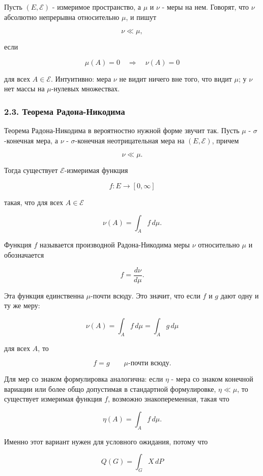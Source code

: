 \documentclass[
  11pt,
  a4paper,
]{article}
\begin{document}
Пусть \((E,\mathcal E)\) - измеримое пространство, а \(\mu\) и \(\nu\) -
меры на нем. Говорят, что \(\nu\) абсолютно непрерывна относительно
\(\mu\), и пишут

\[
\nu\ll\mu,
\]

если

\[
\mu(A)=0\quad\Longrightarrow\quad \nu(A)=0
\]

для всех \(A\in\mathcal E\). Интуитивно: мера \(\nu\) не видит ничего
вне того, что видит \(\mu\); у \(\nu\) нет массы на \(\mu\)-нулевых
множествах.

\subsubsection{2.3. Теорема
Радона-Никодима}\label{ux442ux435ux43eux440ux435ux43cux430-ux440ux430ux434ux43eux43dux430-ux43dux438ux43aux43eux434ux438ux43cux430}

Теорема Радона-Никодима в вероятностно нужной форме звучит так. Пусть
\(\mu\) - \(\sigma\)-конечная мера, а \(\nu\) - \(\sigma\)-конечная
неотрицательная мера на \((E,\mathcal E)\), причем

\[
\nu\ll\mu.
\]

Тогда существует \(\mathcal E\)-измеримая функция

\[
f:E\to[0,\infty]
\]

такая, что для всех \(A\in\mathcal E\)

\[
\nu(A)=\int_A f\,d\mu.
\]

Функция \(f\) называется производной Радона-Никодима меры \(\nu\)
относительно \(\mu\) и обозначается

\[
f=\frac{d\nu}{d\mu}.
\]

Эта функция единственна \(\mu\)-почти всюду. Это значит, что если \(f\)
и \(g\) дают одну и ту же меру:

\[
\nu(A)=\int_A f\,d\mu=\int_A g\,d\mu
\]

для всех \(A\), то

\[
f=g
\qquad \mu\text{-почти всюду}.
\]

Для мер со знаком формулировка аналогична: если \(\eta\) - мера со
знаком конечной вариации или более общо допустимая в стандартной
формулировке, \(\eta\ll\mu\), то существует измеримая функция \(f\),
возможно знакопеременная, такая что

\[
\eta(A)=\int_A f\,d\mu.
\]

Именно этот вариант нужен для условного ожидания, потому что

\[
Q(G)=\int_G X\,dP
\]
\end{document}
